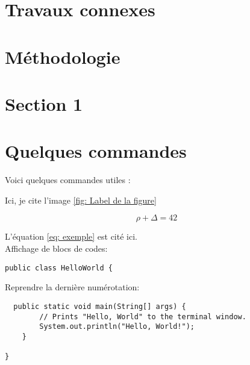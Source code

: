 \documentclass{rapportUHA40}
\begin{document}
\section{Travaux connexes}
\lipsum[1-2] 





\newpage

\section{Méthodologie}
\lipsum[2-3]





\newpage

\section{Section 1}




\section{Quelques commandes}

Voici quelques commandes utiles :



Ici, je cite l'image \ref{fig: Label de la figure}



\begin{equation} \label{eq: exemple}
\rho + \Delta = 42
\end{equation}

L'équation \ref{eq: exemple} est cité ici. \\

Affichage de blocs de codes:
\begin{verbatim}
public class HelloWorld {
\end{verbatim}

Reprendre la dernière numérotation:
\begin{verbatim}
  public static void main(String[] args) {
        // Prints "Hello, World" to the terminal window.
        System.out.println("Hello, World!");
    }

}
\end{verbatim}
\end{document}
